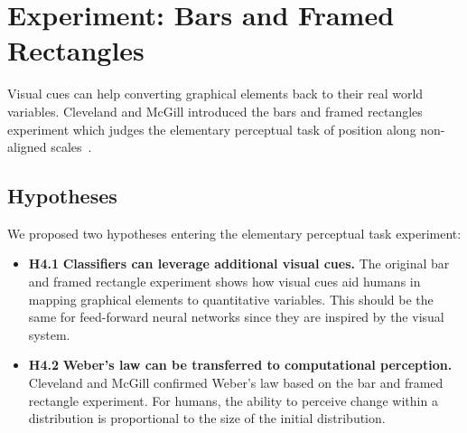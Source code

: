 \section{Experiment: Bars and Framed Rectangles}

Visual cues can help converting graphical elements back to their real world variables. Cleveland and McGill introduced the bars and framed rectangles experiment which judges the elementary perceptual task of position along non-aligned scales~\cite{cleveland_mcgill}. 

\subsection{Hypotheses}

We proposed two hypotheses entering the elementary perceptual task experiment:

\begin{itemize}
	\item \textbf{H4.1} \textbf{Classifiers can leverage additional visual cues.} The original bar and framed rectangle experiment shows how visual cues aid humans in mapping graphical elements to quantitative variables. This should be the same for feed-forward neural networks since they are inspired by the visual system.
	\item \textbf{H4.2} \textbf{Weber's law can be transferred to computational perception.} Cleveland and McGill confirmed Weber's law based on the bar and framed rectangle experiment. For humans, the ability to perceive change within a distribution is proportional to the size of the initial distribution.
\end{itemize}

